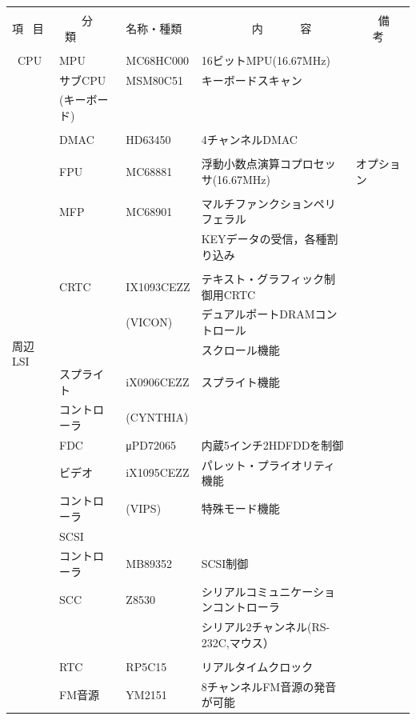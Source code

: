 \documentclass[twoside,a4paper,12pt]{article}
\begin{document}
\setlength{\tabcolsep}{0.5mm}
\begin{tabular}{|p{13mm}|p{25mm}|p{22mm}|p{73mm}|p{30mm}|}
\hline
& & & &\\[-2mm]
項 \ 目& \ \ \ \ 分 \ 類 & \ 名称・種類 & \ \ \ \ \ \ \ \ \ 内 \ \ \ \ \ \ 容 & \ \ \ \ 備 \ \ \ 考\\
\hline
& & & &\\[-3mm]
\ CPU & MPU & \ MC68HC000 & 16ビットMPU(16.67MHz) &\\
& サブCPU & \ MSM80C51 & キーボードスキャン &\\
& (キーボード) & & &\\
\hline
\multirow{19}{13mm}{周辺 LSI} & & & &\\[-3mm]
& DMAC & \ HD63450 & 4チャンネルDMAC &\\
\cline{2-5}
& & & &\\[-3mm]
& FPU & \ MC68881 & 浮動小数点演算コプロセッサ(16.67MHz) & オプション\\
\cline{2-5}
& & & &\\[-3mm]
& MFP & \ MC68901 & マルチファンクションペリフェラル &\\
& & & KEYデータの受信，各種割り込み &\\
\cline{2-5}
& & & &\\[-3mm]
& CRTC & \ IX1093CEZZ & テキスト・グラフィック制御用CRTC &\\
& & \ (VICON) & デュアルポートDRAMコントロール &\\
& & & スクロール機能 &\\[3mm]
\cline{2-5}
& & & &\\[-1mm]
& スプライト & \ iX0906CEZZ & スプライト機能 &\\
& コントローラ & \ (CYNTHIA) & &\\
& FDC & \ μPD72065 & 内蔵5インチ2HDFDDを制御 &\\
& ビデオ & \ iX1095CEZZ & パレット・プライオリティ機能 &\\
& コントローラ & \ (VIPS) & 特殊モード機能 &\\
& SCSI & & &\\
& コントローラ & \ MB89352 & SCSI制御 &\\
& SCC & \ Z8530 & シリアルコミュニケーションコントローラ &\\
& & & シリアル2チャンネル(RS-232C,マウス） &\\
& & & &\\
& RTC & \ RP5C15 & リアルタイムクロック &\\
& FM音源 & \ YM2151 & 8チャンネルFM音源の発音が可能 &\\

\end{tabular}
\end{document}
